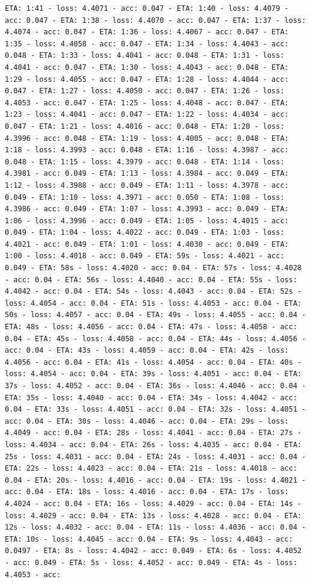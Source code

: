 \documentclass[11pt]{article}
\begin{document}
\begin{Verbatim}[commandchars=\\\{\}]
ETA: 1:41 - loss: 4.4071 - acc: 0.047 - ETA: 1:40 - loss: 4.4079 - acc: 0.047 - ETA: 1:38 - loss: 4.4070 - acc: 0.047 - ETA: 1:37 - loss: 4.4074 - acc: 0.047 - ETA: 1:36 - loss: 4.4067 - acc: 0.047 - ETA: 1:35 - loss: 4.4058 - acc: 0.047 - ETA: 1:34 - loss: 4.4043 - acc: 0.048 - ETA: 1:33 - loss: 4.4041 - acc: 0.048 - ETA: 1:31 - loss: 4.4041 - acc: 0.047 - ETA: 1:30 - loss: 4.4043 - acc: 0.048 - ETA: 1:29 - loss: 4.4055 - acc: 0.047 - ETA: 1:28 - loss: 4.4044 - acc: 0.047 - ETA: 1:27 - loss: 4.4050 - acc: 0.047 - ETA: 1:26 - loss: 4.4053 - acc: 0.047 - ETA: 1:25 - loss: 4.4048 - acc: 0.047 - ETA: 1:23 - loss: 4.4041 - acc: 0.047 - ETA: 1:22 - loss: 4.4034 - acc: 0.047 - ETA: 1:21 - loss: 4.4016 - acc: 0.048 - ETA: 1:20 - loss: 4.3996 - acc: 0.048 - ETA: 1:19 - loss: 4.4005 - acc: 0.048 - ETA: 1:18 - loss: 4.3993 - acc: 0.048 - ETA: 1:16 - loss: 4.3987 - acc: 0.048 - ETA: 1:15 - loss: 4.3979 - acc: 0.048 - ETA: 1:14 - loss: 4.3981 - acc: 0.049 - ETA: 1:13 - loss: 4.3984 - acc: 0.049 - ETA: 1:12 - loss: 4.3988 - acc: 0.049 - ETA: 1:11 - loss: 4.3978 - acc: 0.049 - ETA: 1:10 - loss: 4.3971 - acc: 0.050 - ETA: 1:08 - loss: 4.3986 - acc: 0.049 - ETA: 1:07 - loss: 4.3993 - acc: 0.049 - ETA: 1:06 - loss: 4.3996 - acc: 0.049 - ETA: 1:05 - loss: 4.4015 - acc: 0.049 - ETA: 1:04 - loss: 4.4022 - acc: 0.049 - ETA: 1:03 - loss: 4.4021 - acc: 0.049 - ETA: 1:01 - loss: 4.4030 - acc: 0.049 - ETA: 1:00 - loss: 4.4018 - acc: 0.049 - ETA: 59s - loss: 4.4021 - acc: 0.049 - ETA: 58s - loss: 4.4020 - acc: 0.04 - ETA: 57s - loss: 4.4028 - acc: 0.04 - ETA: 56s - loss: 4.4040 - acc: 0.04 - ETA: 55s - loss: 4.4042 - acc: 0.04 - ETA: 54s - loss: 4.4043 - acc: 0.04 - ETA: 52s - loss: 4.4054 - acc: 0.04 - ETA: 51s - loss: 4.4053 - acc: 0.04 - ETA: 50s - loss: 4.4057 - acc: 0.04 - ETA: 49s - loss: 4.4055 - acc: 0.04 - ETA: 48s - loss: 4.4056 - acc: 0.04 - ETA: 47s - loss: 4.4058 - acc: 0.04 - ETA: 45s - loss: 4.4058 - acc: 0.04 - ETA: 44s - loss: 4.4056 - acc: 0.04 - ETA: 43s - loss: 4.4059 - acc: 0.04 - ETA: 42s - loss: 4.4056 - acc: 0.04 - ETA: 41s - loss: 4.4054 - acc: 0.04 - ETA: 40s - loss: 4.4054 - acc: 0.04 - ETA: 39s - loss: 4.4051 - acc: 0.04 - ETA: 37s - loss: 4.4052 - acc: 0.04 - ETA: 36s - loss: 4.4046 - acc: 0.04 - ETA: 35s - loss: 4.4040 - acc: 0.04 - ETA: 34s - loss: 4.4042 - acc: 0.04 - ETA: 33s - loss: 4.4051 - acc: 0.04 - ETA: 32s - loss: 4.4051 - acc: 0.04 - ETA: 30s - loss: 4.4046 - acc: 0.04 - ETA: 29s - loss: 4.4049 - acc: 0.04 - ETA: 28s - loss: 4.4041 - acc: 0.04 - ETA: 27s - loss: 4.4034 - acc: 0.04 - ETA: 26s - loss: 4.4035 - acc: 0.04 - ETA: 25s - loss: 4.4031 - acc: 0.04 - ETA: 24s - loss: 4.4031 - acc: 0.04 - ETA: 22s - loss: 4.4023 - acc: 0.04 - ETA: 21s - loss: 4.4018 - acc: 0.04 - ETA: 20s - loss: 4.4016 - acc: 0.04 - ETA: 19s - loss: 4.4021 - acc: 0.04 - ETA: 18s - loss: 4.4016 - acc: 0.04 - ETA: 17s - loss: 4.4024 - acc: 0.04 - ETA: 16s - loss: 4.4029 - acc: 0.04 - ETA: 14s - loss: 4.4029 - acc: 0.04 - ETA: 13s - loss: 4.4028 - acc: 0.04 - ETA: 12s - loss: 4.4032 - acc: 0.04 - ETA: 11s - loss: 4.4036 - acc: 0.04 - ETA: 10s - loss: 4.4045 - acc: 0.04 - ETA: 9s - loss: 4.4043 - acc: 0.0497 - ETA: 8s - loss: 4.4042 - acc: 0.049 - ETA: 6s - loss: 4.4052 - acc: 0.049 - ETA: 5s - loss: 4.4052 - acc: 0.049 - ETA: 4s - loss: 4.4053 - acc: 
\end{Verbatim}
\end{document}
